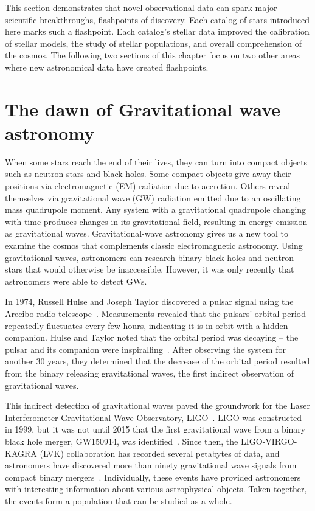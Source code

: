 This section demonstrates that novel observational data can spark major scientific breakthroughs, flashpoints of discovery. 
Each catalog of stars introduced here marks such a flashpoint. 
Each catalog's stellar data improved the calibration of stellar models, the study of stellar populations, and  overall comprehension of the cosmos. 
The following two sections of this chapter focus on two other areas where new astronomical data have created flashpoints. 

\section{The dawn of Gravitational wave astronomy}

When some stars reach the end of their lives, they can turn into compact objects such as neutron stars and black holes. 
Some compact objects give away their positions via electromagnetic (EM) radiation due to accretion. 
Others reveal themselves via gravitational wave (GW) radiation emitted due to an oscillating mass quadrupole moment.
Any system with a gravitational quadrupole changing with time produces changes in its gravitational field, resulting in energy emission as gravitational waves.
Gravitational-wave astronomy gives us a new tool to examine the cosmos that complements classic electromagnetic astronomy.
Using gravitational waves, astronomers can research binary black holes and neutron stars that would otherwise be inaccessible.
However, it was only recently that astronomers were able to detect GWs. 

In 1974, Russell Hulse and Joseph Taylor discovered a pulsar signal using the Arecibo radio telescope~\cite{Hulse:1975:ApJL}.
Measurements revealed that the pulsars' orbital period repeatedly fluctuates every few hours, indicating it is in orbit with a hidden companion.
Hulse and Taylor noted that the orbital period was decaying -- the pulsar and its companion were inspiralling~\cite{Hulse:1975:ApJL}.
After observing the system for another 30 years, they determined that the decrease of the orbital period resulted from the binary releasing gravitational waves, the first indirect observation of gravitational waves.

This indirect detection of gravitational waves paved the groundwork for the Laser Interferometer Gravitational-Wave Observatory, LIGO~\cite{Barish:1999:PhT}. 
LIGO was constructed in 1999, but it was not until 2015 that the first gravitational wave from a binary black hole merger, GW150914, was identified~\cite{abbott2016observation}.
Since then, the LIGO-VIRGO-KAGRA (LVK) collaboration has recorded several petabytes of data, and astronomers have discovered more than ninety gravitational wave signals from compact binary mergers~\cite{abbott2019gwtc, gwtc2, gwtc3}.
Individually, these events have provided astronomers with interesting information about various astrophysical objects. 
Taken together, the events form a population that can be studied as a whole. 

